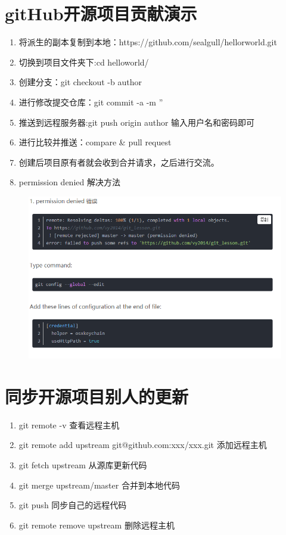 \documentclass{article}
\begin{document}
	\section{gitHub开源项目贡献演示}
	\begin{enumerate}
		\item 将派生的副本复制到本地：https://github.com/sealgull/hellorworld.git
		
		\item 切换到项目文件夹下:cd helloworld/
		
		\item 创建分支：git checkout -b author
		
		\item 进行修改提交仓库：git commit -a -m ''
		
		\item 推送到远程服务器:git push origin author 输入用户名和密码即可
		
		\item 进行比较并推送：compare \& pull request
		
		\item 创建后项目原有者就会收到合并请求，之后进行交流。
		
		\item permission denied 解决方法
		
	\end{enumerate}
	\begin{figure}[h]
		\centering
		\includegraphics[scale=0.5]{1}
	\end{figure}

	\section{同步开源项目别人的更新}
	\begin{enumerate}
		\item git remote -v 查看远程主机
		\item git remote add upstream git@github.com:xxx/xxx.git 添加远程主机
		\item git fetch upstream 从源库更新代码
		\item git merge upstream/master 合并到本地代码
		\item git push 同步自己的远程代码
		\item git remote remove upstream 删除远程主机
	\end{enumerate}
\end{document}

